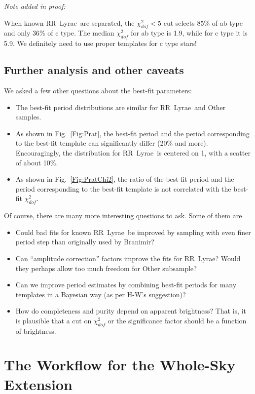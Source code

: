 \documentclass[12pt, preprint]{aastex}
\def\RR  {\hbox{RR Lyrae}}
\begin{document}
\newpage
{\it Note added in proof:}

When known \RR\ are separated, the $\chi^2_{dof}<5$ cut selects 85\% of ab type
and only 36\% of c type. The median $\chi^2_{dof}$ for ab type is 1.9, while for 
c type it is 5.9. We definitely need to use proper templates for c type stars! 





\subsection{Further analysis and other caveats} 

We asked a few other questions about the best-fit parameters:
\begin{itemize}
\item The best-fit period distributions are similar for \RR\ and Other samples. 
\item As shown in Fig.~\ref{Fig:Prat}, the best-fit period and the period corresponding
to the best-fit template can significantly differ (20\% and more). Encouragingly, 
the distribution for \RR\ is centered on 1, with a scatter of about 10\%. 
\item As shown in Fig.~\ref{Fig:PratChi2}, the ratio of the best-fit period and 
the period corresponding to the best-fit template is not correlated with the
best-fit $\chi^2_{dof}$.  
\end{itemize}

Of course, there are many more interesting questions to ask. Some of them are
\begin{itemize}
\item Could bad fits for known \RR\ be improved by sampling with even finer period
step than originally used by Branimir? 
\item Can ``amplitude correction'' factors improve the fits for \RR? Would they 
perhaps allow too much freedom for Other subsample? 
\item Can we improve period estimates by combining best-fit periods for many 
templates in a Bayesian way (as per H-W's suggestion)? 
\item How do completeness and purity depend on apparent brightness? That is,
it is plausible that a cut on $\chi^2_{dof}$ or the significance factor should be
a function of brightness. 
\end{itemize}



\section{The Workflow for the Whole-Sky Extension} 
\end{document}
